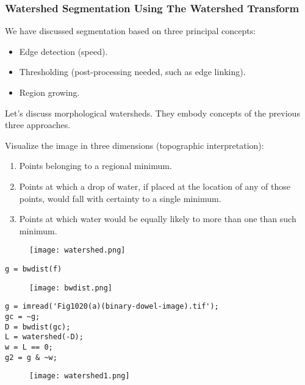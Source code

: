 \begin{frame}
\frametitle{Watershed Segmentation Using The Watershed Transform}
We have discussed segmentation based on three principal concepts:
\begin{itemize}
\item Edge detection (speed).
\item Thresholding (post-processing needed, such as edge linking).
\item Region growing.
\end{itemize}
Let's discuss morphological watersheds. They embody concepts of the previous three approaches.
\end{frame}


\begin{frame}
Visualize the image in three dimensions (topographic interpretation):
\begin{enumerate}
\item Points belonging to a regional minimum.
\item Points at which a drop of water, if placed at the location of any of those points, would fall with certainty to a single minimum.
\item Points at which water would be equally likely to more than one than such minimum.
\end{enumerate}
\begin{figure}[!h]
\centering
\texttt{[image: watershed.png]}
\end{figure}
\end{frame}


\begin{frame}[fragile]
\begin{lstlisting}
g = bwdist(f)
\end{lstlisting}
\begin{figure}[!h]
\centering
\texttt{[image: bwdist.png]}
\end{figure}
\end{frame}

\begin{frame}[fragile]
\begin{lstlisting}
g = imread('Fig1020(a)(binary-dowel-image).tif');
gc = ~g;
D = bwdist(gc);
L = watershed(-D);
w = L == 0;
g2 = g & ~w;
\end{lstlisting}
\end{frame}

\begin{frame}
\begin{figure}[!h]
\centering
\texttt{[image: watershed1.png]}
\end{figure}
\end{frame}

